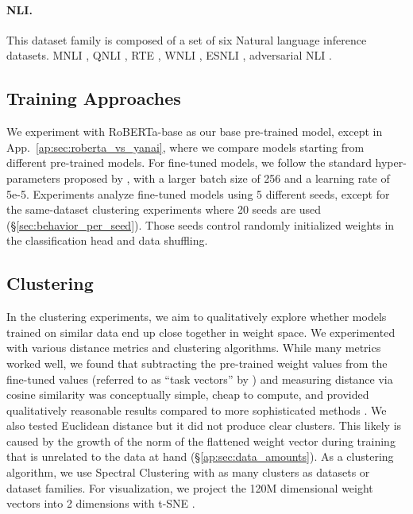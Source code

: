\documentclass[nohyperref]{article}
\theoremstyle{plain}
\theoremstyle{definition}
\theoremstyle{remark}
\begin{document}
\paragraph{NLI.} This dataset family is composed of a set of six Natural language inference datasets. MNLI \citep{williams-etal-2018-broad}, QNLI \citealt{rajpurkar-etal-2016-squad}, RTE \citep{Dagan2005ThePR,BarHaim2006TheSP,Giampiccolo2007TheTP,Bentivogli2009TheSP}, WNLI \citep{Levesque2011TheWS}, ESNLI \citep{Camburu2018eSNLINL}, adversarial NLI \citep{nie-etal-2020-adversarial}.
%

\subsection{Training Approaches}\label{sec:settings} 

We experiment with RoBERTa-base \citep{Liu2019RoBERTaAR} as our base pre-trained model, except in App.~\ref{ap:sec:roberta_vs_yanai}, where we compare models starting from different pre-trained models.
For fine-tuned models, %
we follow the standard hyper-parameters proposed by \citet{Liu2019RoBERTaAR}, with a larger batch size of 256 and a learning rate of 5e-5. Experiments analyze fine-tuned models using 5 different seeds, except for the same-dataset clustering experiments where 20 seeds are used (\S\ref{sec:behavior_per_seed}). Those seeds control randomly initialized weights in the classification head and data shuffling.


\subsection{Clustering}\label{sec:Clustering} 
In the clustering experiments, we aim to qualitatively explore whether models trained on similar data end up close together in weight space.
We experimented with various distance metrics and clustering algorithms.
While many metrics worked well, we found that subtracting the pre-trained weight values from the fine-tuned values (referred to as ``task vectors'' by \citet{ilharco2022editing}) and measuring distance via cosine similarity was conceptually simple, cheap to compute, and provided qualitatively reasonable results compared to more sophisticated methods \citep{kornblith2019similarity,toledo2022revisiting}.
We also tested Euclidean distance but it did not produce clear clusters. This likely is caused by the growth of the norm of the flattened weight vector during training \citep{merrill2020parameter} that is unrelated to the data at hand (\S\ref{ap:sec:data_amounts}).
As a clustering algorithm, we use Spectral Clustering with as many clusters as datasets or dataset families.
For visualization, we project the 120M dimensional weight vectors into 2 dimensions with t-SNE \citep{van2008visualizing}. 
\end{document}
